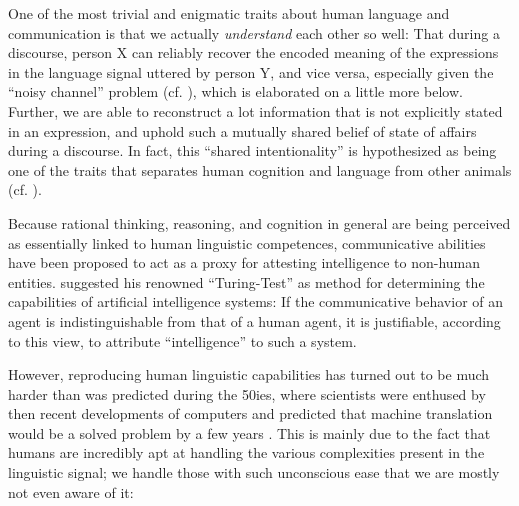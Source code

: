 One of the most trivial and enigmatic traits about human language and communication is
that we actually \emph{understand} each other so well: That during a discourse, person
X can reliably recover the encoded meaning of the expressions in the language signal
uttered by person Y, and vice versa, especially given the ``noisy channel'' problem (cf.
\cite{plotkin2000language}), which is elaborated on a little more below. Further, we are
able to reconstruct a lot information that is not explicitly stated in an expression, and
uphold such a mutually shared belief of state of affairs during a discourse. In fact,
this ``shared intentionality'' is hypothesized as being one of the traits that separates
human cognition and language from other animals (cf. \cite{tomasello2007shared}).

Because {\color{red} rational} thinking, reasoning, and cognition in general are being perceived
as essentially linked to human linguistic competences, communicative abilities have been proposed
to act as a proxy for attesting intelligence to non-human entities. \cite{turing1950computing}
suggested his renowned ``Turing-Test'' as method for determining the capabilities of artificial
intelligence systems: If the communicative behavior of an agent is indistinguishable from that of
a human agent, it is justifiable, according to this view, to attribute ``intelligence'' to such a
system.

However, reproducing human linguistic capabilities has turned out to be much harder
than was predicted during the 50ies, where scientists were enthused by then recent
developments of computers and predicted that machine translation would be a solved
problem by a few years \citep{hutchins2005history}. This is mainly due to the fact
that humans are incredibly apt at handling the various complexities present in the
linguistic signal; we handle those with such unconscious ease that we are mostly
not even aware of it:

